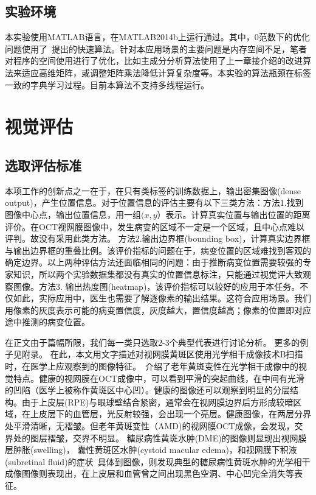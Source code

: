    \subsection{实验环境}
    本实验使用MATLAB语言，在MATLAB2014b上运行通过。其中，0范数下的优化问题使用了~提出的快速算法。针对本应用场景的主要问题是内存空间不足，笔者对程序的空间使用进行了优化，比如主成分分析算法使用了上一章接介绍的改进算法来适应高维矩阵，或调整矩阵乘法降低计算复杂度等。本实验的算法瓶颈在标签一致的字典学习过程。目前本算法不支持多线程运行。



\section{视觉评估}
    \label{sec:visualize}
    \subsection{选取评估标准}
    本项工作的创新点之一在于，在只有类标签的训练数据上，输出密集图像(dense output)，产生位置信息。对于位置信息的评估主要有以下三类方法：方法1.找到图像中心点，输出位置信息，用一组$(x, y）$表示。计算真实位置与输出位置的距离评价。在OCT视网膜图像中，发生病变的区域不一定是一个区域，且中心点难以评判。故没有采用此类方法。 方法2.输出边界框(bounding box)，计算真实边界框与输出边界框的重叠比例。该评价指标的问题在于，病变位置的区域难找到客观的确定边界。以上两种评估方法还面临相同的问题：由于推断病变位置需要较强的专家知识，所以两个实验数据集都没有真实的位置信息标注，只能通过视觉评大致观察图像。方法3. 输出热度图(heatmap)，该评价指标可以较好的应用于本任务。不仅如此，实际应用中，医生也需要了解逐像素的输出结果。这符合应用场景。我们用像素的灰度表示可能的病变置信度，灰度越大，置信度越高；像素的位置即对应途中推测的病变位置。


    在正文由于篇幅所限，我们每一类只选取2-3个典型代表进行讨论分析。 更多的例子见附录。
    在此，本文用文字描述对视网膜黄斑区使用光学相干成像技术B扫描时，在医学上应观察到的图像特征。~介绍了老年黄斑变性在光学相干成像中的视觉特点。健康的视网膜在OCT成像中，可以看到平滑的突起曲线，在中间有光滑的凹陷（医学上被称作黄斑区中心凹）。健康的图像还可以观察到明显的分层结构。由于上皮层(RPE)与眼球壁结合紧密，通常会在视网膜边界后方形成较暗区域，在上皮层下的血管层，光反射较强，会出现一个亮层。健康图像，在两层分界处平滑清晰，无褶皱。但老年黄斑变性（AMD)的视网膜OCT成像，会发现，交界处的图层褶皱，交界不明显。 糖尿病性黄斑水肿(DME)的图像则显现出视网膜层肿胀(swelling)， 囊性黄斑区水肿(cystoid macular edema)，和视网膜下积液(subretinal fluid)的症状~\cite{bhagat2009diabetic}具体到图像，则发现典型的糖尿病性黄斑水肿的光学相干成像图像则表现出，在上皮层和血管曾之间出现黑色空洞、中心凹完全消失等表征。


